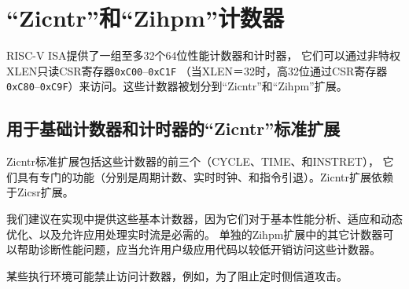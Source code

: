 \chapter{“Zicntr”和“Zihpm”计数器}
\label{counters}

RISC-V ISA提供了一组至多32个64位性能计数器和计时器，
它们可以通过非特权XLEN只读CSR寄存器{\tt 0xC00}--{\tt 0xC1F}
（当XLEN＝32时，高32位通过CSR寄存器{\tt 0xC80}--{\tt 0xC9F}）来访问。这些计数器被划分到“Zicntr”和“Zihpm”扩展。

\section{用于基础计数器和计时器的“Zicntr”标准扩展}

Zicntr标准扩展包括这些计数器的前三个（CYCLE、TIME、和INSTRET），
它们具有专门的功能（分别是周期计数、实时时钟、和指令引退）。Zicntr扩展依赖于Zicsr扩展。

\begin{commentary}
  我们建议在实现中提供这些基本计数器，因为它们对于基本性能分析、适应和动态优化、以及允许应用处理实时流是必需的。
  单独的Zihpm扩展中的其它计数器可以帮助诊断性能问题，应当允许用户级应用代码以较低开销访问这些计数器。

某些执行环境可能禁止访问计数器，例如，为了阻止定时侧信道攻击。
\end{commentary}

